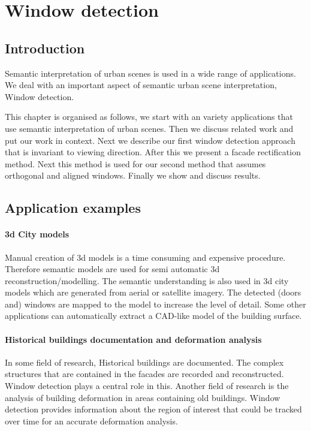 
\section{Window detection}
\label{sec:windowDetection}
\subsection{Introduction}
Semantic interpretation of urban scenes is used in a wide range of applications.
We deal with an important aspect of semantic urban scene interpretation, Window detection. 

This chapter is organised as follows, we start with an variety applications that
use semantic interpretation of urban scenes.  Then we discuss related work and
put our work in context.  Next we describe our first window detection approach
that is invariant to viewing direction.  After this we present a facade
rectification method. Next this method is used for our second method that assumes
orthogonal and aligned windows.  Finally we show and discuss results. 

\subsection{Application examples}
\paragraph{3d City models} 
	Manual creation of 3d models is a time consuming and expensive procedure.
	Therefore semantic models are used for semi automatic 3d
	reconstruction/modelling.
	The semantic understanding is also used in 3d city models which are
	generated from aerial or satellite imagery.  The detected (doors and)
	windows are mapped to the model to increase the level of detail. 
	Some other applications can automatically extract a CAD-like model of
	the building surface.

\paragraph{Historical buildings documentation and deformation analysis}
	In some field of research, Historical buildings are documented. The complex
	structures that are contained in the facades are recorded and reconstructed.
	Window detection plays a central role in this. 
	Another field of research is the analysis of building deformation in areas
	containing old buildings.  Window detection provides information about the
	region of interest that could be tracked over time for an accurate
	deformation analysis.


